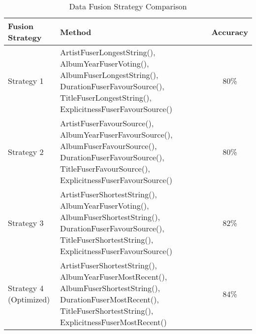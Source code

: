 \documentclass[runningheads]{llncs}
\begin{document}
\begin{table}[h!]
	\setlength{\tabcolsep}{4pt}
	\small
	\caption{Data Fusion Strategy Comparison}
	\label{tab:fusion-strategies}
	\begin{threeparttable}
	\begin{tabular}{p{2.5cm}p{7.5cm}c}
	\hline
	\textbf{Fusion Strategy} & \textbf{Method} & \textbf{Accuracy} \\ \hline
	Strategy 1 & \raggedright ArtistFuserLongestString(), \newline
	AlbumYearFuserVoting(), \newline
	AlbumFuserLongestString(), \newline
	DurationFuserFavourSource(), \newline
	TitleFuserLongestString(), \newline
	ExplicitnessFuserFavourSource() & 80\% \\
	\hline
	Strategy 2 & \raggedright ArtistFuserFavourSource(), \newline
	AlbumYearFuserFavourSource(), \newline
	AlbumFuserFavourSource(), \newline
	DurationFuserFavourSource(), \newline
	TitleFuserFavourSource(), \newline
	ExplicitnessFuserFavourSource() & 80\% \\
	\hline
	Strategy 3 & \raggedright ArtistFuserShortestString(), \newline
	AlbumYearFuserVoting(), \newline
	AlbumFuserShortestString(), \newline
	DurationFuserFavourSource(), \newline
	TitleFuserShortestString(), \newline
	ExplicitnessFuserFavourSource() & 82\% \\
	\hline
	\rowcolor[HTML]{FFFFCC}
	Strategy 4 \newline (Optimized) & \raggedright ArtistFuserShortestString(), \newline
	AlbumYearFuserMostRecent(), \newline
	AlbumFuserShortestString(), \newline
	DurationFuserMostRecent(), \newline
	TitleFuserShortestString(), \newline
	ExplicitnessFuserMostRecent() & 84\% \\ \hline
	\end{tabular}
	\end{threeparttable}
	\end{table}
\end{document}
